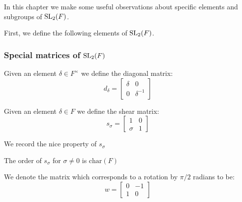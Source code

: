 In this chapter we make some useful observations about specific elements and subgroups of $\operatorname{SL}_2(F)$. 

First, we define the following elements of $\operatorname{SL}_2(F)$.

\subsubsection{Special matrices of $\operatorname{SL}_2(F)$}

\begin{definition}
\label{SpecialMatrices.d}
\leanok
    Given an element $\delta \in F^\times$ we define the diagonal matrix:
    \[
    d_\delta = \begin{bmatrix}
        \delta & 0\\
        0 & \delta^{-1}
    \end{bmatrix}
    \]
\end{definition}

\begin{definition}
\label{SpecialMatrices.s}
\leanok
    Given an element $\delta \in F$ we define the shear matrix:
    \[
    s_\sigma  = \begin{bmatrix}
    1 & 0\\
    \sigma & 1
    \end{bmatrix}
    \]
\end{definition}

We record the nice property of $s_\sigma$

\begin{lemma}
\label{SpecialMatrices.order_s_eq_char}
\leanok

The order of $s_\sigma$ for $\sigma \ne 0$ is $\textrm{char}(F)$
\end{lemma}



\begin{definition}
\label{SpecialMatrices.w}
\leanok
 We denote the matrix which corresponds to a rotation by $\pi / 2$ radians to be:
 \[
 w = \begin{bmatrix}
    0 & -1\\
    1 & 0
 \end{bmatrix}
 \]
\end{definition}

